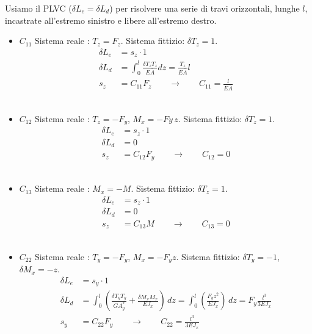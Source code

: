 Usiamo il PLVC ($\delta L_e =  \delta L_d $) per risolvere una serie di travi orizzontali, lunghe $l$, incastrate all'estremo sinistro e libere all'estremo destro.
\begin{itemize}
    \item $C_{11}$
    Sistema reale : $T_z = F_z $. Sistema fittizio: $\delta T_z = 1$. 
    \begin{align*}
        \delta L_e &= s_z \cdot 1 \\
        \delta L_d &= \int_0^l \frac{\delta T_z T_z}{E\bar{A}} dz = \frac{T_z}{E\bar{A}}l\\
        s_z &= C_{11} F_z\quad \quad\rightarrow\quad\quad C_{11} =\frac{l}{E\bar{A}}
    \end{align*}\\

    \item $C_{12}$
    Sistema reale : $T_z = -F_y $, $M_x=-Fy\,z$. Sistema fittizio: $\delta T_z = 1$. 
    \begin{align*}
        \delta L_e &= s_z \cdot 1 \\
        \delta L_d &= 0\\
        s_z &= C_{12} F_y\quad \quad\rightarrow\quad\quad C_{12} =0
    \end{align*}\\

    \item $C_{13}$
    Sistema reale : $M_x=-M$. Sistema fittizio: $\delta T_z = 1$. 
    \begin{align*}
        \delta L_e &= s_z \cdot 1 \\
        \delta L_d &= 0\\
        s_z &= C_{13} M\quad \quad\rightarrow\quad\quad C_{13} =0
    \end{align*}\\

    \item $C_{22}$
    Sistema reale : $T_y = -F_y $, $M_x =-F_yz$. Sistema fittizio: $\delta T_y = -1$, $\delta M_x = -z$. 
    \begin{align*}
        \delta L_e &= s_y \cdot 1 \\
        \delta L_d &= \int_0^l \left(  \frac{\delta T_y T_y}{GA^*_y} +  \frac{\delta M_xM_x}{EJ_x}\right)\,dz 
        =\int_0^l \left(    \frac{F_yz^2}{EJ_x}  \right)\,dz 
        = F_y\frac{l^3}{3EJ_x}\\
        s_y &= C_{22} F_y\quad \quad\rightarrow\quad\quad C_{22} =\frac{l^3}{3EJ_x}
    \end{align*}\\


\end{itemize}
